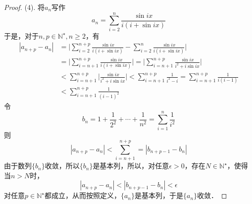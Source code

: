 \begin{proof}
(4). 将$a_n$写作
\begin{equation}
    a_n = \sum_{i=2}^n \frac{\sin ix}{i(i+\sin ix)}
\end{equation}
于是，对于$n,p\in\mathbb{N}^\star, n \geq 2$，有
\begin{align}
    |a_{n+p}-a_n| &= \Bigg\lvert \sum_{i=2}^{n+p}\frac{\sin ix}{i(i+\sin ix)} - \sum_{i=2}^n \frac{\sin ix}{i(i+\sin ix)} \Bigg\rvert \\
    &= \Bigg\lvert \sum_{i=n+1}^{n+p} \frac{\sin ix}{i(i+\sin ix)} \Bigg\rvert = \Bigg\lvert \sum_{i=n+1}^{n+p} \frac{\sin ix}{i^2 + i \sin ix} \Bigg\rvert \\
    &< \sum_{i=n+1}^{n+p} \bigg\lvert \frac{\sin ix}{i^2 + i \sin ix} \bigg\rvert < \sum_{i=n+1}^{n+p}\frac{1}{i^2-i}  = \sum_{i=n+1}^{n+p} \frac{1}{i(i-1)} \\
    &< \sum_{i=n+1}^{n+p}\frac{1}{(i-1)^2}
\end{align}
令
\begin{equation}
    b_n = 1+\frac{1}{2^2}+\cdots+\frac{1}{n^2}=\sum_{i=1}^n\frac{1}{i^2}
\end{equation}
则
\begin{equation}
    |a_{n+p}-a_n|<\sum_{i=n+1}^{n+p} = |b_{n+p-1}-b_{n}|
\end{equation}
由于数列$\{b_n\}$收敛，所以$\{b_n\}$是基本列，所以，对任意$\epsilon>0$，存在$N\in\mathbb{N}^\star$，使得当$n>N$时，
\begin{equation}
    |a_{n+p}-a_n|<|b_{n+p-1}-b_n|<\epsilon
\end{equation}
对任意$p\in\mathbb{N}^\star$都成立，从而按照定义，$\{a_n\}$是基本列，于是$\{a_n\}$收敛．
\end{proof}

